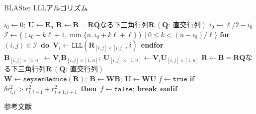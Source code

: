 \documentclass[12pt,aspectratio=169,table,dvipdfmx, leqno]{beamer}
\begin{document}
\begin{frame}%
\begin{algorithm}[H]
    \footnotesize
    \begin{algorithmic}[1]
        \caption{\footnotesize BLASter LLLアルゴリズム\cite{DPS25}}
        \label{alg_blaster_lll}
        \State $i_0\gets 0;~\bm{U}\gets \bm{E}_n$
        \Do
            \State $\bm{R}\gets \bm{B}=\bm{RQ}$なる下三角行列$\bm{R}~(\bm{Q}:~\text{直交行列})$
            \State $i_0\gets \ell/2-i_0$
            \State $\mathcal{I}\gets \{(i_0+k\ell+1, \min\{n, i_0+k\ell+\ell\})~|~0\le k<(n-i_0)/\ell\}$
            \State \textbf{for}~$(i, j)\in\mathcal{I}$~\textbf{do}~$\bm{V}_i\gets \texttt{LLL}(\bm{R}_{[i, j]\times [i, j]}, \delta)$~\textbf{endfor}
                \State $\bm{B}_{[i, j]\times [1, n]}\gets \bm{V}_i\bm{B}_{[i, j]\times [1, n]};~\bm{U}_{[i, j]\times [1, n]}\gets \bm{V}_i\bm{U}_{[i, j]\times [1, n]}$
            \EndFor
            \State $\bm{R}\gets \bm{B}=\bm{RQ}$なる下三角行列$\bm{R}~(\bm{Q}:~\text{直交行列})$
            \State $\bm{W}\gets \texttt{seysenReduce}(\bm{R});~\bm{B}\gets\bm{WB};~\bm{U}\gets\bm{WU}$
            \State $f\gets \texttt{true}$
                \State \textbf{if}~$\delta r_{i, i}^2> r_{i, i+1}^2+r_{i+1, i+1}^2$~\textbf{then}~$f\gets\texttt{false};~\textbf{break}$~\textbf{endif}
            \EndFor
    \end{algorithmic}
\end{algorithm}
\end{frame}

\begin{frame}[allowframebreaks]{参考文献}
\beamertemplatetextbibitems

\typeout{}

\end{frame}
\end{document}
